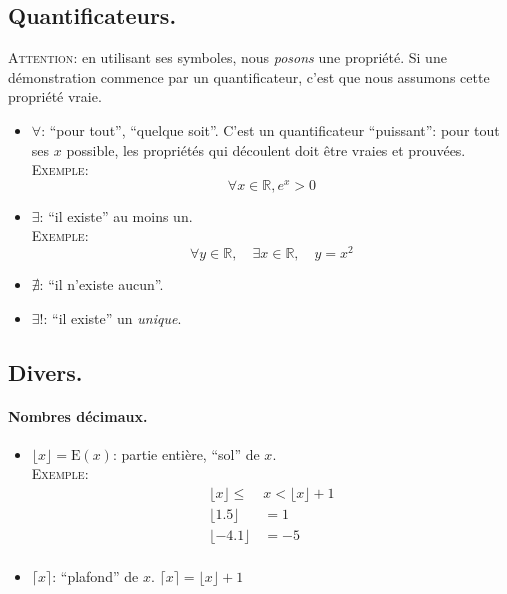 \documentclass{article}
\newcommand{\floor}[1]{\lfloor #1 \rfloor}
\newcommand{\ceil}[1]{\lceil #1 \rceil}
\newcommand{\Ex}{\textsc{Exemple}: }
\begin{document}
\subsection{Quantificateurs.}
\textsc{Attention}: en utilisant ses symboles, nous \textit{posons} une propriété.
Si une démonstration commence par un quantificateur, 
c'est que nous assumons cette propriété vraie.

\begin{itemize}
    \item $\forall$: \enquote{pour tout}, \enquote{quelque soit}. 
        C'est un quantificateur \enquote{puissant}:
        pour tout ses $x$ possible, les propriétés qui découlent 
        doit être vraies et prouvées. \\
        \Ex 
        \begin{equation}    
            \forall x \in \mathbb{R}, e^x > 0
        \end{equation}
        
    \item $\exists$: \enquote{il existe} au moins un. \\
        \Ex 
        \begin{equation}
            \forall y \in \mathbb{R}, \quad 
            \exists x \in \mathbb{R}, \quad
            y = x^2
        \end{equation}

    \item $\nexists$: \enquote{il n'existe aucun}. 
    \item $\exists!$: \enquote{il existe} un \textit{unique}.
\end{itemize}


\subsection{Divers.}

\paragraph{Nombres décimaux.}
\begin{itemize}
    \item $\floor{x} = \text{E}(x)$: partie entière, \enquote{sol} de $x$. \\
        \Ex $$
        \begin{aligned}
            \floor{x}  \leq \; &x < \floor{x} + 1 \\
            \floor{1.5}     &= 1 \\
            \floor{-4.1}    &= -5 \\
        \end{aligned}
        $$
    \item $\ceil{x}$: \enquote{plafond} de $x$. $\ceil{x} = \floor{x} + 1$
\end{itemize}
\end{document}
